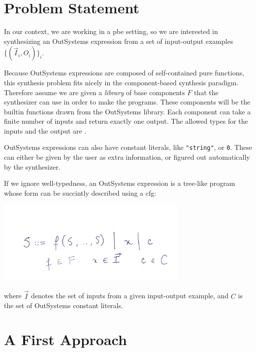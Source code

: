 \section{Problem Statement}
\label{sec:problem-statement}

In our context, we are working in a \gls{pbe} setting, so we are interested in
synthesizing an OutSystems expression from a set of input-output examples
$\{(\vec{I}_i, O_i)\}_i$.

Because OutSystems expressions are composed of self-contained pure functions,
this synthesis problem fits nicely in the component-based synthesis paradigm.
Therefore assume we are given a \textit{library} of base components $F$ that the
synthesizer can use in order to make the programs. These components will be the
builtin functions drawn from the OutSystems library. Each component can take a
finite number of inputs and return exactly one output. The allowed types for the
inputs and the output are .

OutSystems expressions can also have constant literals, like
\lstinline{"string"}, or \lstinline{0}. These can either be given by the user as
extra information, or figured out automatically by the synthesizer.

If we ignore well-typedness, an OutSystems expression is a tree-like program
whose form can be succintly described using a \gls{cfg}:

\begin{center}
  \includegraphics[width=0.7\textwidth]{assets/cfg-expressions.png}
\end{center}


where $\vec{I}$ denotes the set of inputs from a given input-output example, and
$C$ is the set of OutSystems constant literals.


\section{A First Approach}
\label{sec:first-approach}

